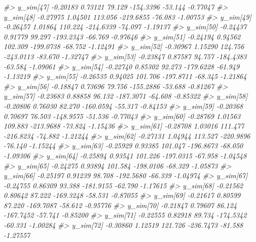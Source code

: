 \documentclass[
  10pt,
  italian,
  a4paper,
  extrafontsizes,onecolumn,openright
  ]{memoir}
\newenvironment{Shaded}{\begin{snugshade}}{\end{snugshade}}
\newcommand{\CommentTok}[1]{\textcolor[rgb]{0.56,0.35,0.01}{\textit{#1}}}
\begin{document}
\begin{Shaded}
\begin{Highlighting}[]
\CommentTok{\#\textgreater{} y\_sim[47]  {-}0.20183 0.73121  79.129 {-}154.3396 {-}53.144 {-}0.77047}
\CommentTok{\#\textgreater{} y\_sim[48]  {-}0.27975 1.04501 113.056 {-}219.6855 {-}76.083 {-}1.00753}
\CommentTok{\#\textgreater{} y\_sim[49]  {-}0.26457 1.01864 110.224 {-}214.6339 {-}74.097 {-}1.19137}
\CommentTok{\#\textgreater{} y\_sim[50]  {-}0.24437 0.91779  99.297 {-}193.2343 {-}66.769 {-}0.97646}
\CommentTok{\#\textgreater{} y\_sim[51]  {-}0.24194 0.94562 102.309 {-}199.0738 {-}68.752 {-}1.12491}
\CommentTok{\#\textgreater{} y\_sim[52]  {-}0.30967 1.15290 124.756 {-}243.0113 {-}83.670 {-}1.32747}
\CommentTok{\#\textgreater{} y\_sim[53]  {-}0.23847 0.87587  94.757 {-}184.4383 {-}63.584 {-}1.09061}
\CommentTok{\#\textgreater{} y\_sim[54]  {-}0.22740 0.85302  92.273 {-}179.6228 {-}61.949 {-}1.13219}
\CommentTok{\#\textgreater{} y\_sim[55]  {-}0.26535 0.94025 101.706 {-}197.8711 {-}68.345 {-}1.21864}
\CommentTok{\#\textgreater{} y\_sim[56]  {-}0.18847 0.73696  79.756 {-}155.2886 {-}53.688 {-}0.81267}
\CommentTok{\#\textgreater{} y\_sim[57]  {-}0.23683 0.88858  96.132 {-}187.3071 {-}64.608 {-}0.85322}
\CommentTok{\#\textgreater{} y\_sim[58]  {-}0.20806 0.76030  82.270 {-}160.0594 {-}55.317 {-}0.84153}
\CommentTok{\#\textgreater{} y\_sim[59]  {-}0.20368 0.70697  76.503 {-}148.9575 {-}51.536 {-}0.77043}
\CommentTok{\#\textgreater{} y\_sim[60]  {-}0.28769 1.01563 109.883 {-}213.9688 {-}73.824 {-}1.15436}
\CommentTok{\#\textgreater{} y\_sim[61]  {-}0.28708 1.03016 111.477 {-}216.8234 {-}74.882 {-}1.21244}
\CommentTok{\#\textgreater{} y\_sim[62]  {-}0.27131 1.04944 113.527 {-}220.9896 {-}76.140 {-}1.15244}
\CommentTok{\#\textgreater{} y\_sim[63]  {-}0.25929 0.93385 101.047 {-}196.8673 {-}68.050 {-}1.09306}
\CommentTok{\#\textgreater{} y\_sim[64]  {-}0.25894 0.93541 101.226 {-}197.0315 {-}67.958 {-}1.04548}
\CommentTok{\#\textgreater{} y\_sim[65]  {-}0.24275 0.93894 101.584 {-}198.0106 {-}68.329 {-}1.05873}
\CommentTok{\#\textgreater{} y\_sim[66]  {-}0.25197 0.91239  98.708 {-}192.5680 {-}66.339 {-}1.04974}
\CommentTok{\#\textgreater{} y\_sim[67]  {-}0.24755 0.86309  93.388 {-}181.9155 {-}62.790 {-}1.17615}
\CommentTok{\#\textgreater{} y\_sim[68]  {-}0.21562 0.80642  87.222 {-}169.3248 {-}58.531 {-}0.87055}
\CommentTok{\#\textgreater{} y\_sim[69]  {-}0.21617 0.80599  87.220 {-}169.7087 {-}58.612 {-}0.95776}
\CommentTok{\#\textgreater{} y\_sim[70]  {-}0.21847 0.79607  86.124 {-}167.7452 {-}57.741 {-}0.85200}
\CommentTok{\#\textgreater{} y\_sim[71]  {-}0.22555 0.82918  89.734 {-}174.5342 {-}60.331 {-}1.00284}
\CommentTok{\#\textgreater{} y\_sim[72]  {-}0.30860 1.12519 121.726 {-}236.7473 {-}81.588 {-}1.27557}

\end{Highlighting}
\end{Shaded}
\end{document}
